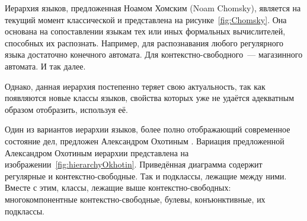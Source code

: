 \begin{marginfigure}
    \begin{center}
    \end{center}
    \caption{Иерархия языков по Хомскому}
    \label{fig:Chomsky}
\end{marginfigure}
Иерархия языков, предложенная Ноамом Хомским (Noam Chomsky), является на текущий момент классической и представлена на рисунке~\ref{fig:Chomsky}.
Она основана на сопоставлении языкам тех или иных формальных вычислителей, способных их распознать.
Например, для распознавания любого регулярного языка достаточно конечного автомата. Для контекстно-свободного~--- магазинного автомата. И так далее.

Однако, данная иерархия постепенно теряет свою актуальность, так как появляются новые классы языков, свойства которых уже не удаётся адекватным образом отобразить, используя её.

Один из вариантов иерархии языков, более полно отображающий современное состояние дел, предложен Александром Охотиным%
.
Вариация предложенной Александром Охотиным иерархии представлена на изображении~\ref{fig:hierarchyOkhotin}.
Приведённая диаграмма содержит регулярные и контекстно-свободные.
Так и подклассы, лежащие между ними.
Вместе с этим, классы, лежащие выше контекстно-свободных: многокомпонентные контекстно-свободные, булевы, конъюнктивные, их подклассы.

